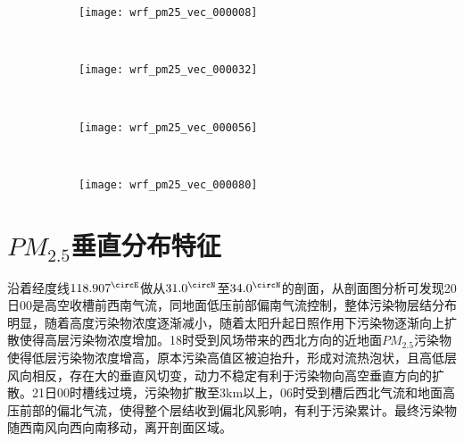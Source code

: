 \begin{figure}[!htbp]
	\centering
	\begin{subfigure}[b]{0.40\textwidth}
		\texttt{[image: wrf\_pm25\_vec\_000008]}
		\caption{}
		\label{fig:wrf_pm25_vec_000008}
	\end{subfigure}%
	~%
	\begin{subfigure}[b]{0.40\textwidth}
		\texttt{[image: wrf\_pm25\_vec\_000032]}
		\caption{}
		\label{fig:wrf_pm25_vec_000032}
	\end{subfigure}
	\\%
	\begin{subfigure}[b]{0.40\textwidth}
		\texttt{[image: wrf\_pm25\_vec\_000056]}
		\caption{}
		\label{fig:wrf_pm25_vec_000032}
	\end{subfigure}
	~%
	\begin{subfigure}[b]{0.40\textwidth}
		\texttt{[image: wrf\_pm25\_vec\_000080]}
		\caption{}
		\label{fig:wrf_pm25_vec_000032}
	\end{subfigure}
	\label{fig:oaspl}
\end{figure}

\section{$PM_{2.5}$垂直分布特征}

沿着经度线$118.907^\circE$做从$31.0^\circN$至$34.0^\circN$的剖面，从剖面图分析可发现20日00是高空收槽前西南气流，同地面低压前部偏南气流控制，整体污染物层结分布明显，随着高度污染物浓度逐渐减小，随着太阳升起日照作用下污染物逐渐向上扩散使得高层污染物浓度增加。18时受到风场带来的西北方向的近地面$PM_{2.5}$污染物使得低层污染物浓度增高，原本污染高值区被迫抬升，形成对流热泡状，且高低层风向相反，存在大的垂直风切变，动力不稳定有利于污染物向高空垂直方向的扩散。21日00时槽线过境，污染物扩散至3km以上，06时受到槽后西北气流和地面高压前部的偏北气流，使得整个层结收到偏北风影响，有利于污染累计。最终污染物随西南风向西向南移动，离开剖面区域。

